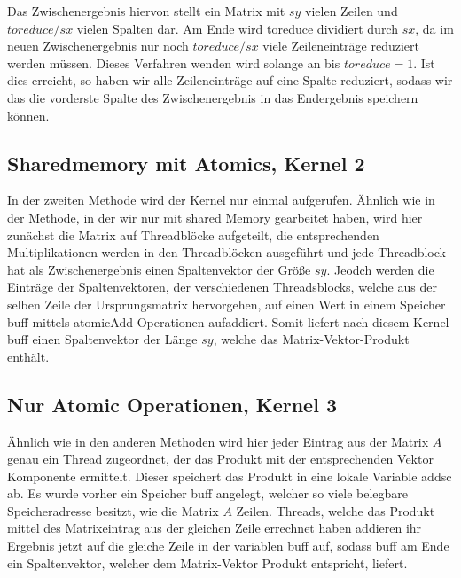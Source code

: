 \documentclass[10pt,a4paper]{article}
\begin{document}
	 Das Zwischenergebnis hiervon stellt ein Matrix mit $sy$ vielen Zeilen und $toreduce/sx$ vielen Spalten dar.
	 Am Ende wird toreduce dividiert durch $sx$, da im neuen Zwischenergebnis nur noch $toreduce/sx$ viele Zeileneinträge reduziert werden müssen. Dieses Verfahren wenden wird solange an bis $toreduce=1$. Ist dies erreicht, so haben wir alle Zeileneinträge auf eine Spalte reduziert, sodass wir das die vorderste Spalte des Zwischenergebnis in das Endergebnis speichern können.
	 \subsection{Sharedmemory mit Atomics, Kernel 2}
	 In der zweiten Methode wird der Kernel nur einmal aufgerufen. Ähnlich wie in der Methode, in der wir nur mit shared Memory gearbeitet haben, wird hier zunächst die Matrix auf Threadblöcke aufgeteilt, die entsprechenden Multiplikationen werden in den Threadblöcken ausgeführt und jede Threadblock hat als Zwischenergebnis einen Spaltenvektor der Größe $sy$. Jeodch werden die Einträge der Spaltenvektoren, der verschiedenen Threadsblocks, welche aus der selben Zeile der Ursprungsmatrix hervorgehen, auf einen Wert in einem Speicher buff mittels atomicAdd Operationen aufaddiert. Somit liefert nach diesem Kernel buff einen Spaltenvektor der Länge $sy$, welche das Matrix-Vektor-Produkt enthält.
	 \subsection{Nur Atomic Operationen, Kernel 3}
	 Ähnlich wie in den anderen Methoden wird hier jeder Eintrag aus der Matrix $A$ genau ein Thread zugeordnet, der das Produkt mit der entsprechenden Vektor Komponente ermittelt. Dieser speichert das Produkt in eine lokale Variable addsc ab. Es wurde vorher ein Speicher buff angelegt, welcher so viele belegbare Speicheradresse besitzt, wie die Matrix $A$ Zeilen. Threads, welche das Produkt mittel des Matrixeintrag aus der gleichen Zeile errechnet haben addieren ihr Ergebnis jetzt auf die gleiche Zeile in der variablen buff auf, sodass buff am Ende ein Spaltenvektor, welcher dem Matrix-Vektor Produkt entspricht, liefert.
\end{document}
